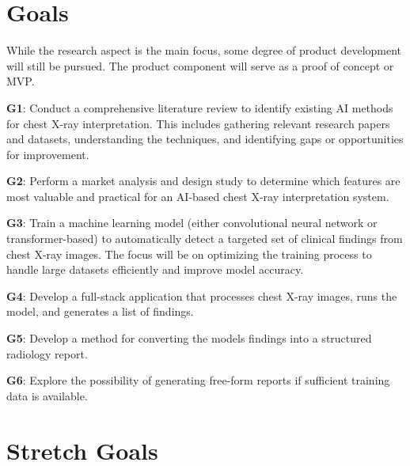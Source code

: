 \documentclass{article}
\begin{document}
\section{Goals}
While the research aspect is the main focus, some degree of product development will still be pursued. The product component will serve as a proof of concept or MVP.\\
\begin{itemize}
\begin{item}
    \textbf{G1}: Conduct a comprehensive literature review to identify existing AI methods for chest X-ray interpretation. This includes gathering relevant research papers and datasets, understanding the techniques, and identifying gaps or opportunities for improvement. 
\end{item}
\begin{item}
    \textbf{G2}: Perform a market analysis and design study to determine which features are most valuable and practical for an AI-based chest X-ray interpretation system.
\end{item}
\begin{item}
    \textbf{G3}: Train a machine learning model (either convolutional neural network or transformer-based) to automatically detect a targeted set of clinical findings from chest X-ray images. The focus will be on optimizing the training process to handle large datasets efficiently and improve model accuracy.
\end{item}
\begin{item}
    \textbf{G4}: Develop a full-stack application that processes chest X-ray images, runs the model, and generates a list of findings.
\end{item}
\begin{item}
    \textbf{G5}: Develop a method for converting the models findings into a structured radiology report. 
\end{item}
\begin{item}
    \textbf{G6}: Explore the possibility of generating free-form reports if sufficient training data is available.
\end{item}
\end{itemize}

\section{Stretch Goals}
\end{document}
